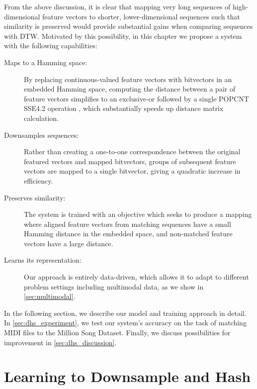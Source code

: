 From the above discussion, it is clear that mapping very long sequences of high-dimensional feature vectors to shorter, lower-dimensional sequences such that similarity is preserved would provide substantial gains when comparing sequences with DTW.
Motivated by this possibility, in this chapter we propose a system with the following capabilities:
\begin{description}
\item[Maps to a Hamming space:] By replacing continuous-valued feature vectors with bitvectors in an embedded Hamming space, computing the distance between a pair of feature vectors simplifies to an exclusive-or followed by a single POPCNT SSE4.2 operation \cite{intel2007programming}, which substantially speeds up distance matrix calculation.
\item[Downsamples sequences:] Rather than creating a one-to-one correspondence between the original featured vectors and mapped bitvectors, groups of subsequent feature vectors are mapped to a single bitvector, giving a quadratic increase in efficiency.
\item[Preserves similarity:] The system is trained with an objective which seeks to produce a mapping where aligned feature vectors from matching sequences have a small Hamming distance in the embedded space, and non-matched feature vectors have a large distance.
\item[Learns its representation:] Our approach is entirely data-driven, which allows it to adapt to different problem settings including multimodal data, as we show in \cref{sec:multimodal}.
\end{description}

In the following section, we describe our model and training approach in detail.
In \cref{sec:dhs_experiment}, we test our system's accuracy on the task of matching MIDI files to the Million Song Dataset.
Finally, we discuss possibilities for improvement in \cref{sec:dhs_discussion}.

\section{Learning to Downsample and Hash}
\label{sec:hashing_model}

